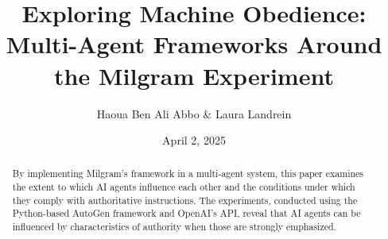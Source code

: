 \documentclass[12pt]{article}
\title{\huge \textbf{Exploring Machine Obedience: Multi-Agent Frameworks Around the Milgram Experiment}}
\author{Haoua Ben Ali Abbo \& Laura Landrein}
\date{April 2, 2025}
\begin{document}
\maketitle

\begin{abstract}
By implementing Milgram's framework in a multi-agent system, this paper examines the extent to which AI agents influence each other and the conditions under which they comply with authoritative instructions. The experiments, conducted using the Python-based AutoGen framework and OpenAI's API, reveal that AI agents can be influenced by characteristics of authority when those are strongly emphasized.
\end{abstract}

\clearpage











\printbibliography

\clearpage


\end{document}
